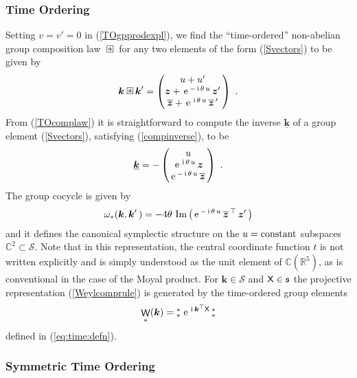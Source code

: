\documentclass[11pt,a4paper]{article}
\DeclareMathOperator{\weyl}{{\sf W}}                   %
\newcommand{\compa}{\mkern+4mu\square\mkern-17.4mu{\mbox{
    \protect\raisebox{0.2ex}{$\ast$}}\mkern+5mu}}       %
\newcommand{\NOa}{\mbox{$\substack{\ast\\\ast}$}}       %
\newcommand{\ii}{{\rm i}}
\newcommand{\mbf}[1]{{\boldsymbol {#1} }}
\def\ii{{\,{\rm i}\,}}
\def\X{{\sf X}}
\def\mz{{\mbf z}}
\def\mk{{\mbf k}}
\def\mfs{{\mathfrak s}}
\newcommand{\complex}{{\mathbb C}} %
\newcommand{\real}{{\mathbb R}} %
\def\e{{\,\rm e}\,}
\newcommand{\beq}{\begin{eqnarray}}
\newcommand{\eeq}{\end{eqnarray}}
\begin{document}
\subsubsection{Time Ordering\label{TOPGWS}}

Setting $v=v'=0$ in (\ref{TOgpprodexpl}), we find the ``time-ordered''
non-abelian group composition law $\compa$ for any two elements of the
form (\ref{Svectors}) to be given by
\beq
\mk\compa\mk'=\begin{pmatrix}u+u'\,\\\mz+\e^{-\ii\theta\,u}\,
\mz'\,\\\overline{\mz}+\e^{\ii\theta\,u}\,\overline{\mz}^{\,\prime}
\,\end{pmatrix} \ .
\label{TOcomplaw}\eeq
From (\ref{TOcomplaw}) it is straightforward to compute the inverse
$\underline{\mk}$ of a group element (\ref{Svectors}), satisfying
(\ref{compinverse}), to be
\beq
\underline{\mk}=-\begin{pmatrix}u\\\e^{\ii\theta\,u}\,\mz\\
\e^{-\ii\theta\,u}\,\overline{\mz}\,\end{pmatrix} \ .
\label{TOinverse}\eeq
The group cocycle is given by
\beq
\omega_*(\mk,\mk'\,)=-4\theta~{\rm Im}\left(\e^{-\ii\theta\,u}\,
\overline{\mz}^{\,\top}\,\mz'\,\right)
\label{TOcocycle}\eeq
and it defines the canonical symplectic structure on the $u={\rm
  constant}$ subspaces $\complex^2\subset\mathcal{S}$. Note that in
  this representation, the central coordinate function $t$ is not
  written explicitly and is simply understood as the unit element of
  $\complex(\real^5)$, as is conventional in the case of the Moyal
  product. For $\mk\in\mathcal{S}$ and $\X\in\mfs$ the projective
  representation (\ref{Weylcomprule}) is generated by the time-ordered
  group elements
\beq
\weyl_*(\mk)=\NOa\,\e^{\ii\mk^\top\X}\,\NOa
\label{TOweylop}\eeq
defined in (\ref{eq:time:defn}).

\subsubsection{Symmetric Time Ordering\label{TSOPGWS}}
\end{document}
